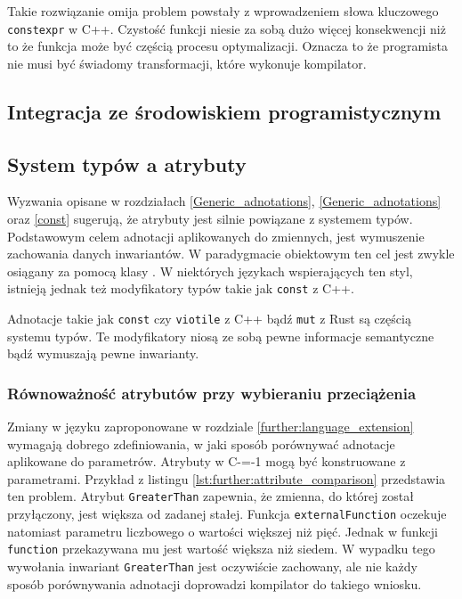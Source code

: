 Takie rozwiązanie omija problem powstały z wprowadzeniem słowa kluczowego \lstinline{constexpr} w C++\cite{Klimiankou:contexpr_great_good_wrong_idea}.
Czystość funkcji niesie za sobą dużo więcej konsekwencji niż to że funkcja może być częścią procesu optymalizacji.
Oznacza to że programista nie musi być świadomy transformacji, które wykonuje kompilator.

\subsection{Integracja ze środowiskiem programistycznym}
\label{IDE_integration}

\subsection{System typów a atrybuty}
\label{further:adnotated_type_system}

Wyzwania opisane w rozdziałach \ref{Generic_adnotations}, \ref{Generic_adnotations} oraz \ref{const} sugerują, że atrybuty jest silnie powiązane z systemem typów.
Podstawowym celem adnotacji aplikowanych do zmiennych, jest wymuszenie zachowania danych inwariantów.
W paradygmacie obiektowym ten cel jest zwykle osiągany za pomocą klasy \cite{oop_paradignm}.
W niektórych językach wspierających ten styl, istnieją jednak też modyfikatory typów takie jak \lstinline{const} z C++.

Adnotacje takie jak \lstinline{const} czy \lstinline{viotile} z C++ bądź \lstinline{mut} z Rust \cite{klabnik2019rust} są częścią systemu typów.
Te modyfikatory niosą ze sobą pewne informacje semantyczne bądź wymuszają pewne inwarianty.

\subsubsection{Równoważność atrybutów przy wybieraniu przeciążenia}
\label{further:adnotated_type_system:attribute_equivalence}

Zmiany w języku zaproponowane w rozdziale \ref{further:language_extension} wymagają dobrego zdefiniowania, w jaki sposób porównywać adnotacje aplikowane do parametrów.
Atrybuty w C-=-1 mogą być konstruowane z parametrami.
Przykład z listingu \ref{lst:further:attribute_comparison} przedstawia ten problem.
Atrybut \lstinline{GreaterThan} zapewnia, że zmienna, do której został przyłączony, jest większa od zadanej stałej.
Funkcja \lstinline{externalFunction} oczekuje natomiast parametru liczbowego o wartości większej niż pięć.
Jednak w funkcji \lstinline{function} przekazywana mu jest wartość większa niż siedem.
W wypadku tego wywołania inwariant \lstinline{GreaterThan} jest oczywiście zachowany, ale nie każdy sposób porównywania adnotacji doprowadzi kompilator do takiego wniosku.

